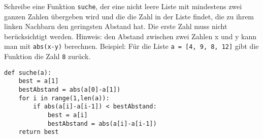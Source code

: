 \question[4]
Schreibe eine Funktion \texttt{suche}, der eine nicht leere Liste mit mindestens
zwei ganzen Zahlen übergeben wird und die die Zahl in der Liste findet,
die zu ihrem linken Nachbarn den geringsten Abstand hat. Die erste
Zahl muss nicht berücksichtigt werden. Hinweis: den Abstand zwischen zwei
Zahlen x und y kann man mit \texttt{abs(x-y)} berechnen.
Beispiel: Für die Liste \texttt{a = [4, 9, 8, 12]} gibt die Funktion
die Zahl \texttt{8} zurück.

\begin{solutionbox}{9cm}
\begin{lstlisting}
def suche(a):
    best = a[1]
    bestAbstand = abs(a[0]-a[1])
    for i in range(1,len(a)):
        if abs(a[i]-a[i-1]) < bestAbstand:
            best = a[i]
            bestAbstand = abs(a[i]-a[i-1])
    return best
\end{lstlisting}
\end{solutionbox}
